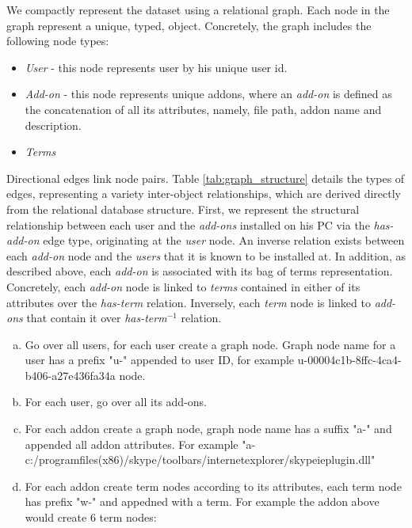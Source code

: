 \documentclass[11pt,oneside]{book}
\begin{document}
We compactly represent the dataset using a relational graph. Each node in the graph represent a unique, typed,  object.  Concretely, the graph includes the following node types:
\begin{itemize}
\renewcommand{\labelitemi}{$\bullet$} 
\item {\it User} - this node represents user by his unique user id. 
\item {\it Add-on} - this node represents unique addons, where an {\it add-on} is defined as the concatenation of all its attributes, namely, file path, addon name and description.
\item {\it Terms} 
\end{itemize}
Directional edges link node pairs.
Table \ref{tab:graph_structure} details the types of edges, representing a variety inter-object relationships, which are derived directly from the relational database structure.
First, we represent the structural relationship between each user and the {\it add-ons} installed on his PC via the {\it has-add-on} edge type, originating at the {\it user} node. An inverse relation exists between each {\it add-on} node and the {\it users} that it is known to be installed at. 
In addition, as described above, each {\it add-on} is associated with its bag of terms representation. Concretely, each {\it add-on} node is linked to {\it terms} contained in either of its attributes over the {\it has-term} relation. Inversely, each {\it term} node is linked to {\it add-ons} that contain it over {\it has-term$^{-1}$} relation.



\iffalse
\begin{small}
\begin{enumerate}[(a)]
\item Go over all users, for each user create a graph node. Graph node name for a user has a prefix "u-" appended to user ID, for example u-00004c1b-8ffc-4ca4-b406-a27e436fa34a node.

\item For each user, go over all its add-ons.
\item For each addon create a graph node, graph node name has a suffix "a-" and appended all addon attributes. For example "a-c:/programfiles(x86)/skype/toolbars/internetexplorer/skypeieplugin.dll"
\item For each addon create term nodes according to its attributes, each term node has prefix "w-" and appedned with a term. For example the addon above would create 6 term nodes:
\end{enumerate}
\end{small}
\end{document}
